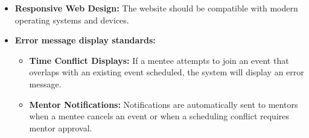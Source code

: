\begin{itemize}
    \item \textbf{Responsive Web Design:} The website should be compatible with
    modern operating systems and devices.

    \item \textbf{Error message display standards:}
    \begin{itemize}
        \item \textbf{Time Conflict Displays:} If a mentee attempts to join an
        event that overlaps with an existing event scheduled, the system will
        display an error message.
        
        \item \textbf{Mentor Notifications:} Notifications are automatically
        sent to mentors when a mentee cancels an event or when a scheduling
        conflict requires mentor approval.
    \end{itemize}
\end{itemize}
